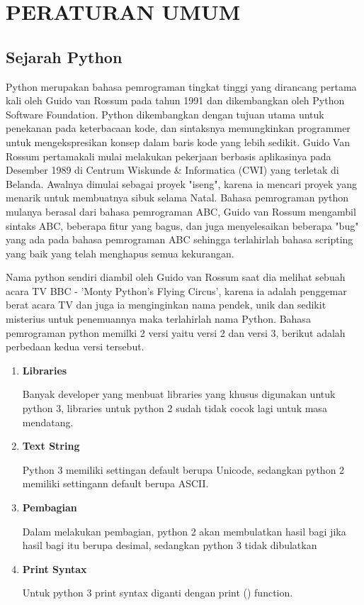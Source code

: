 \chapter{PERATURAN UMUM}
\section{Sejarah Python}
Python merupakan bahasa pemrograman tingkat tinggi yang dirancang pertama kali oleh  Guido van Rossum pada tahun 1991 dan dikembangkan oleh Python Software Foundation. Python dikembangkan dengan tujuan utama untuk penekanan pada keterbacaan kode, dan sintaksnya memungkinkan programmer untuk mengekspresikan konsep dalam baris kode yang lebih sedikit.
 Guido Van Rossum pertamakali mulai melakukan pekerjaan berbasis aplikasinya pada Desember 1989 di Centrum Wiskunde \& Informatica (CWI) yang terletak di Belanda. Awalnya dimulai sebagai proyek "iseng", karena ia mencari proyek yang menarik untuk membuatnya sibuk selama Natal. Bahasa pemrograman python mulanya berasal dari bahasa pemrograman ABC, Guido van Rossum mengambil sintaks ABC, beberapa fitur yang bagus, dan juga menyelesaikan beberapa "bug" yang ada pada bahasa pemrograman ABC sehingga terlahirlah bahasa scripting yang baik yang telah menghapus semua kekurangan. \\
\par 
Nama python sendiri diambil oleh Guido van Rossum saat dia melihat sebuah acara TV BBC - 'Monty Python’s Flying Circus', karena ia adalah penggemar berat acara TV dan juga ia menginginkan nama pendek, unik dan sedikit misterius untuk penemuannya maka terlahirlah nama Python. 
Bahasa pemrograman python memilki 2 versi yaitu versi 2 dan versi 3, berikut adalah perbedaan kedua versi tersebut.

\begin{enumerate}
\item \textbf{Libraries}
\par 
Banyak developer yang menbuat libraries yang khusus digunakan untuk python 3, libraries untuk python 2 sudah tidak cocok lagi untuk masa mendatang.
\item \textbf{Text String}
\par 
Python 3 memiliki settingan default berupa Unicode, sedangkan python 2 memiliki settingann default berupa ASCII.
\item \textbf{Pembagian}
\par 
Dalam melakukan pembagian, python 2 akan membulatkan hasil bagi jika hasil bagi itu berupa desimal, sedangkan python 3 tidak dibulatkan
\item \textbf{Print Syntax}
\par 
Untuk python 3 print syntax diganti dengan print () function.
\end{enumerate}

